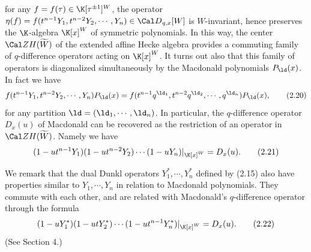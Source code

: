 for any $f=f(\tau)\in \K[\tau^{\pm 1}]^W$, 
the operator 
$\eta(f)=f(t^{n-1}Y_1,t^{n-2}Y_2,\cdots,Y_n)\in{\Cal D}_{q,x}[W]$
is $W$-invariant, hence preserves the $\K$-algebra 
$\K[x]^W$ of symmetric polynomials. 
In this way, the center ${\Cal Z}H(\widetilde{W})$ of the extended 
affine Hecke algebra provides a commuting family of 
$q$-difference operators acting on $\K[x]^W$.  
It turns out also that this family of operators is diagonalized
simultaneously by the Macdonald polynomials $P_\ld(x)$. 
In fact we have 
$$
f(t^{n-1}Y_1,t^{n-2}Y_2,\cdots,Y_n) P_\ld(x)
=f(t^{n-1}q^{\ld_1},t^{n-2}q^{\ld_2},\cdots,q^{\ld_n}) P_\ld(x),
\tag{2.20}
$$
for any partition $\ld=(\ld_1,\cdots,\ld_n)$.  
In particular, the $q$-difference operator  $D_x(u)$ of Macdonald 
can be recovered as the restriction of an operator in 
${\Cal Z}H(\widetilde{W})$.  
Namely we have 
$$
(1-ut^{n-1}Y_1)(1-ut^{n-2}Y_2)\cdots(1-uY_n) \vert_{\K[x]^W}
=D_x(u).
\tag{2.21}
$$
\par
We remark that the dual Dunkl operators $Y_1^\ast,\cdots,Y_n^\ast$ defined 
by (2.15) also have properties similar to $Y_1,\cdots,Y_n$ in relation to 
Macdonald polynomials.  
They commute with each other, and are related with Macdonald's 
$q$-difference operator through the formula
$$
(1-uY^\ast_1)(1-utY^\ast_2)\cdots(1-ut^{n-1}Y^\ast_n) \vert_{\K[x]^W}
=D_x(u).
\tag{2.22}
$$
(See Section 4.) 
%
